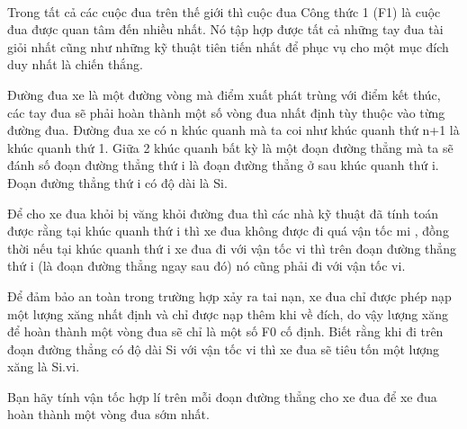  

Trong tất cả các cuộc đua trên thế giới thì cuộc đua Công thức 1 (F1) là cuộc đua được quan tâm đến nhiều nhất. Nó tập hợp được tất cả những tay đua tài giỏi nhất cũng như những kỹ thuật tiên tiến nhất để phục vụ cho một mục đích duy nhất là chiến thắng.

Đường đua xe là một đường vòng mà điểm xuất phát trùng với điểm kết thúc, các tay đua sẽ phải hoàn thành một số vòng đua nhất định tùy thuộc vào từng đường đua. Đường đua xe có n khúc quanh mà ta coi như khúc quanh thứ n+1 là khúc quanh thứ 1. Giữa 2 khúc quanh bất kỳ là một đoạn đường thẳng mà ta sẽ đánh số đoạn đường thẳng thứ i là đoạn đường thẳng ở sau khúc quanh thứ i. Đoạn đường thẳng thứ i có độ dài là Si.

Để cho xe đua khỏi bị văng khỏi đường đua thì các nhà kỹ thuật đã tính toán được rằng tại khúc quanh thứ i thì xe đua không được đi quá vận tốc mi , đồng thời nếu tại khúc quanh thứ i xe đua đi với vận tốc vi thì trên đoạn đường thẳng thứ i (là đoạn đường thẳng ngay sau đó) nó cũng phải đi với vận tốc vi.

Để đảm bảo an toàn trong trường hợp xảy ra tai nạn, xe đua chỉ được phép nạp một lượng xăng nhất định và chỉ được nạp thêm khi về đích, do vậy lượng xăng để hoàn thành một vòng đua sẽ chỉ là một số F0 cố định. Biết rằng khi đi trên đoạn đường thẳng có độ dài Si với vận tốc vi thì xe đua sẽ tiêu tốn một lượng xăng là Si.vi.

Bạn hãy tính vận tốc hợp lí trên mỗi đoạn đường thẳng cho xe đua để xe đua hoàn thành một vòng đua sớm nhất.